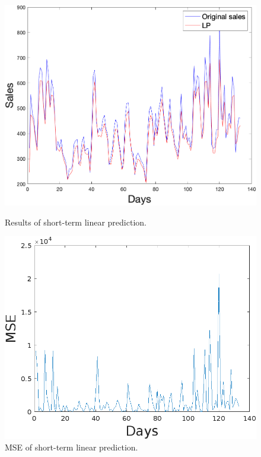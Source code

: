     \begin{figure}[h]
        \centering
        \begin{minipage}{0.45\textwidth}
            \centering
            \includegraphics[width=1\textwidth]{figures/expLP.png}
            \caption{Results of short-term linear prediction.}
            \label{fig:slpres}
        \end{minipage}\hfill
        \begin{minipage}{0.45\textwidth}
            \centering
            \includegraphics[width=\textwidth]{figures/expMseLP.png}
            \caption{MSE of short-term linear prediction.}
            \label{fig:slpmse}
        \end{minipage}
    \end{figure}
    \newpage
